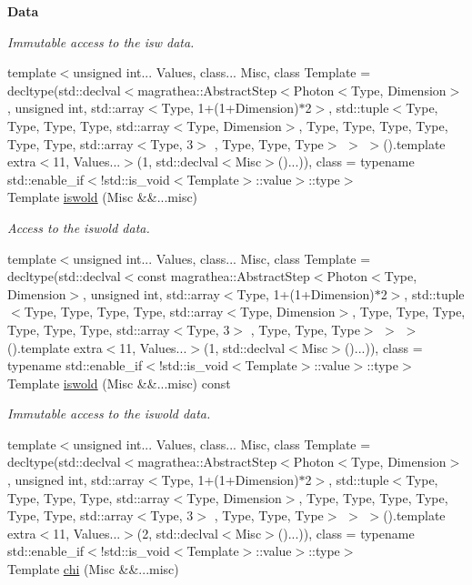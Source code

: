 \begin{Indent}{\bf Data}
\begin{DoxyCompactItemize}
\begin{DoxyCompactList}\small\item\em Immutable access to the isw data. \end{DoxyCompactList}\item 
{\footnotesize template$<$unsigned int... Values, class... Misc, class Template  = decltype(std\-::declval$<$magrathea\-::\-Abstract\-Step$<$\-Photon$<$\-Type, Dimension$>$, unsigned int, std\-::array$<$\-Type, 1+(1+\-Dimension)$\ast$2$>$, std\-::tuple$<$\-Type, Type, Type, Type, std\-::array$<$\-Type, Dimension$>$, Type, Type, Type, Type, Type, Type, std\-::array$<$\-Type, 3$>$ , Type, Type, Type$>$ $>$ $>$().\-template extra$<$11, Values...$>$(1, std\-::declval$<$\-Misc$>$()...)), class  = typename std\-::enable\-\_\-if$<$!std\-::is\-\_\-void$<$\-Template$>$\-::value$>$\-::type$>$ }\\Template \hyperlink{exceptionPhoton_ab58fe6f67399288e1b103009ab77de24}{iswold} (Misc \&\&...misc)
\begin{DoxyCompactList}\small\item\em Access to the iswold data. \end{DoxyCompactList}\item 
{\footnotesize template$<$unsigned int... Values, class... Misc, class Template  = decltype(std\-::declval$<$const magrathea\-::\-Abstract\-Step$<$\-Photon$<$\-Type, Dimension$>$, unsigned int, std\-::array$<$\-Type, 1+(1+\-Dimension)$\ast$2$>$, std\-::tuple$<$\-Type, Type, Type, Type, std\-::array$<$\-Type, Dimension$>$, Type, Type, Type, Type, Type, Type, std\-::array$<$\-Type, 3$>$ , Type, Type, Type$>$ $>$ $>$().\-template extra$<$11, Values...$>$(1, std\-::declval$<$\-Misc$>$()...)), class  = typename std\-::enable\-\_\-if$<$!std\-::is\-\_\-void$<$\-Template$>$\-::value$>$\-::type$>$ }\\Template \hyperlink{exceptionPhoton_a07720585665e874cf25cb35631f8f873}{iswold} (Misc \&\&...misc) const 
\begin{DoxyCompactList}\small\item\em Immutable access to the iswold data. \end{DoxyCompactList}\item 
{\footnotesize template$<$unsigned int... Values, class... Misc, class Template  = decltype(std\-::declval$<$magrathea\-::\-Abstract\-Step$<$\-Photon$<$\-Type, Dimension$>$, unsigned int, std\-::array$<$\-Type, 1+(1+\-Dimension)$\ast$2$>$, std\-::tuple$<$\-Type, Type, Type, Type, std\-::array$<$\-Type, Dimension$>$, Type, Type, Type, Type, Type, Type, std\-::array$<$\-Type, 3$>$ , Type, Type, Type$>$ $>$ $>$().\-template extra$<$11, Values...$>$(2, std\-::declval$<$\-Misc$>$()...)), class  = typename std\-::enable\-\_\-if$<$!std\-::is\-\_\-void$<$\-Template$>$\-::value$>$\-::type$>$ }\\Template \hyperlink{exceptionPhoton_a10e99e460ae361531df3eda4913240f3}{chi} (Misc \&\&...misc)

\end{DoxyCompactItemize}
\end{Indent}
